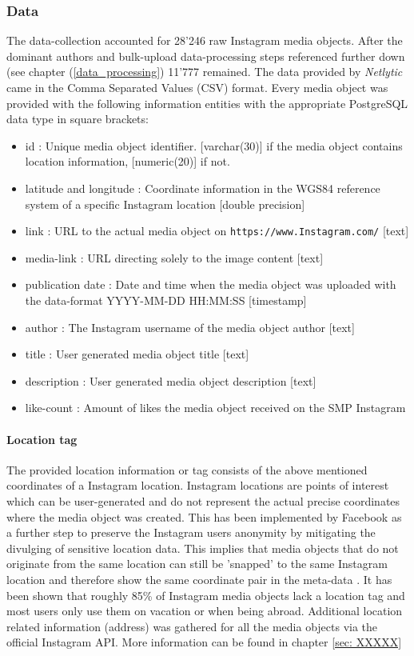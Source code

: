 \subsubsection{Data} \label{Instagram_data}
The data-collection accounted for 28'246 raw Instagram media objects. After the dominant authors and bulk-upload data-processing steps referenced further down (see chapter (\ref{data_processing}) 11'777 remained.
The data provided by \textit{Netlytic} came in the Comma Separated Values (CSV) format. Every media object was provided with the following information entities with the appropriate PostgreSQL data type in square brackets:
\begin{itemize}
    \item id : Unique media object identifier. [varchar(30)] if the media object contains location information, [numeric(20)] if not.
    \item latitude and longitude : Coordinate information in the WGS84 reference system of a specific Instagram location [double precision]
    \item link : URL to the actual media object on \texttt{https://www.Instagram.com/} [text]
    \item media-link : URL directing solely to the image content [text]
    \item publication date : Date and time when the media object was uploaded with the data-format YYYY-MM-DD HH:MM:SS [timestamp]
    \item author : The Instagram username of the media object author [text]
    \item title : User generated media object title [text]
    \item description : User generated media object description [text] 
    \item like-count : Amount of likes the media object received on the SMP Instagram
\end{itemize}

\paragraph{Location tag}
The provided location information or tag consists of the above mentioned coordinates of a Instagram location. Instagram locations are points of interest which can be user-generated and do not represent the actual precise coordinates where the media object was created. This has been implemented by Facebook as a further step to preserve the Instagram users anonymity by mitigating the divulging of sensitive location data. This implies that media objects that do not originate from the same location can still be 'snapped' to the same Instagram location and therefore show the same coordinate pair in the meta-data \cite{InstagramTags}.
It has been shown that roughly 85\% of Instagram media objects lack a location tag \cite{2018InstagramTags} and most users only use them on vacation or when being abroad.
Additional location related information (address) was gathered for all the media objects via the official Instagram API. More information can be found in chapter \ref{sec: XXXXX}


